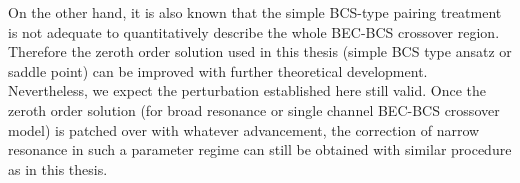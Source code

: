        On the other hand, it is also known that the simple BCS-type pairing treatment is not adequate  to quantitatively describe the whole BEC-BCS crossover region.  Therefore the zeroth order solution used in this thesis (simple BCS type ansatz or saddle point) can be improved with further theoretical development.  Nevertheless, we expect the perturbation established here still valid.  Once the zeroth order solution (for broad resonance or single channel BEC-BCS crossover model) is patched over with whatever advancement, the correction of narrow resonance in such a parameter regime can still be obtained with similar procedure as in this thesis.  